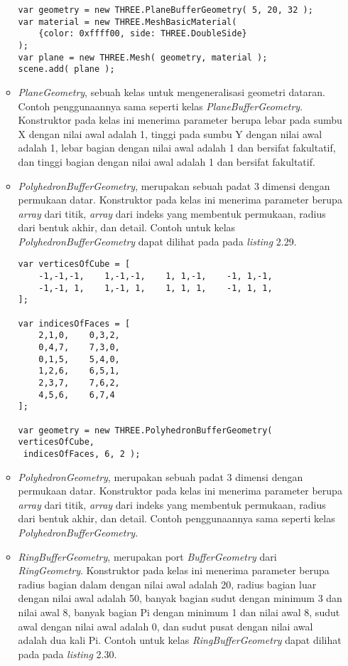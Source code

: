 \begin{itemize}
\begin{itemize}
\begin{lstlisting}[caption={Contoh penggunaan kelas {\it PlaneBufferGeometry}.},captionpos=b]
var geometry = new THREE.PlaneBufferGeometry( 5, 20, 32 );
var material = new THREE.MeshBasicMaterial( 
	{color: 0xffff00, side: THREE.DoubleSide} 
);
var plane = new THREE.Mesh( geometry, material );
scene.add( plane );
\end{lstlisting}

	\item {\it PlaneGeometry}, sebuah kelas untuk mengeneralisasi geometri dataran. Contoh penggunaannya sama seperti kelas {\it PlaneBufferGeometry}. Konstruktor pada kelas ini menerima parameter berupa lebar pada sumbu X dengan nilai awal adalah 1, tinggi pada sumbu Y dengan nilai awal adalah 1, lebar bagian dengan nilai awal adalah 1 dan bersifat fakultatif, dan tinggi bagian dengan nilai awal adalah 1 dan bersifat fakultatif.
	
	\item {\it PolyhedronBufferGeometry}, merupakan sebuah padat 3 dimensi dengan permukaan datar. Konstruktor pada kelas ini menerima parameter berupa {\it array} dari titik, {\it array} dari indeks yang membentuk permukaan, radius dari bentuk akhir, dan detail. Contoh untuk kelas {\it PolyhedronBufferGeometry} dapat dilihat pada pada {\it listing} 2.29.
	
\begin{lstlisting}[caption={Contoh penggunaan kelas {\it PolyhedronBufferGeometry}.},captionpos=b]
var verticesOfCube = [
    -1,-1,-1,    1,-1,-1,    1, 1,-1,    -1, 1,-1,
    -1,-1, 1,    1,-1, 1,    1, 1, 1,    -1, 1, 1,
];

var indicesOfFaces = [
    2,1,0,    0,3,2,
    0,4,7,    7,3,0,
    0,1,5,    5,4,0,
    1,2,6,    6,5,1,
    2,3,7,    7,6,2,
    4,5,6,    6,7,4
];

var geometry = new THREE.PolyhedronBufferGeometry( verticesOfCube,
 indicesOfFaces, 6, 2 );
\end{lstlisting}

	\item {\it PolyhedronGeometry}, merupakan sebuah padat 3 dimensi dengan permukaan datar. Konstruktor pada kelas ini menerima parameter berupa {\it array} dari titik, {\it array} dari indeks yang membentuk permukaan, radius dari bentuk akhir, dan detail. Contoh penggunaannya sama seperti kelas {\it PolyhedronBufferGeometry}.
	
	\item {\it RingBufferGeometry}, merupakan port {\it BufferGeometry} dari {\it RingGeometry}. Konstruktor pada kelas ini menerima parameter berupa radius bagian dalam dengan nilai awal adalah 20, radius bagian luar dengan nilai awal adalah 50, banyak bagian sudut dengan minimum 3 dan nilai awal 8, banyak bagian Pi dengan minimum 1 dan nilai awal 8, sudut awal dengan nilai awal adalah 0, dan sudut pusat dengan nilai awal adalah dua kali Pi. Contoh untuk kelas {\it RingBufferGeometry} dapat dilihat pada pada {\it listing} 2.30.
	

\end{itemize}
\end{itemize}
